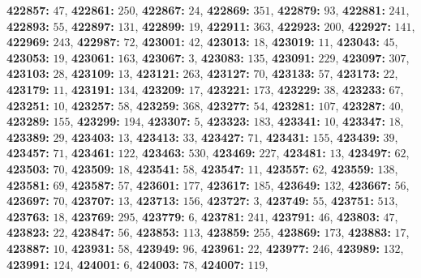 \textsf{\bfseries 422857:} $47$, \textsf{\bfseries 422861:} $250$, \textsf{\bfseries 422867:} $24$, \textsf{\bfseries 422869:} $351$, \textsf{\bfseries 422879:} $93$, \textsf{\bfseries 422881:} $241$, \textsf{\bfseries 422893:} $55$, \textsf{\bfseries 422897:} $131$, \textsf{\bfseries 422899:} $19$, \textsf{\bfseries 422911:} $363$, \textsf{\bfseries 422923:} $200$, \textsf{\bfseries 422927:} $141$, \textsf{\bfseries 422969:} $243$, \textsf{\bfseries 422987:} $72$, \textsf{\bfseries 423001:} $42$, \textsf{\bfseries 423013:} $18$, \textsf{\bfseries 423019:} $11$, \textsf{\bfseries 423043:} $45$, \textsf{\bfseries 423053:} $19$, \textsf{\bfseries 423061:} $163$, \textsf{\bfseries 423067:} $3$, \textsf{\bfseries 423083:} $135$, \textsf{\bfseries 423091:} $229$, \textsf{\bfseries 423097:} $307$, \textsf{\bfseries 423103:} $28$, \textsf{\bfseries 423109:} $13$, \textsf{\bfseries 423121:} $263$, \textsf{\bfseries 423127:} $70$, \textsf{\bfseries 423133:} $57$, \textsf{\bfseries 423173:} $22$, \textsf{\bfseries 423179:} $11$, \textsf{\bfseries 423191:} $134$, \textsf{\bfseries 423209:} $17$, \textsf{\bfseries 423221:} $173$, \textsf{\bfseries 423229:} $38$, \textsf{\bfseries 423233:} $67$, \textsf{\bfseries 423251:} $10$, \textsf{\bfseries 423257:} $58$, \textsf{\bfseries 423259:} $368$, \textsf{\bfseries 423277:} $54$, \textsf{\bfseries 423281:} $107$, \textsf{\bfseries 423287:} $40$, \textsf{\bfseries 423289:} $155$, \textsf{\bfseries 423299:} $194$, \textsf{\bfseries 423307:} $5$, \textsf{\bfseries 423323:} $183$, \textsf{\bfseries 423341:} $10$, \textsf{\bfseries 423347:} $18$, \textsf{\bfseries 423389:} $29$, \textsf{\bfseries 423403:} $13$, \textsf{\bfseries 423413:} $33$, \textsf{\bfseries 423427:} $71$, \textsf{\bfseries 423431:} $155$, \textsf{\bfseries 423439:} $39$, \textsf{\bfseries 423457:} $71$, \textsf{\bfseries 423461:} $122$, \textsf{\bfseries 423463:} $530$, \textsf{\bfseries 423469:} $227$, \textsf{\bfseries 423481:} $13$, \textsf{\bfseries 423497:} $62$, \textsf{\bfseries 423503:} $70$, \textsf{\bfseries 423509:} $18$, \textsf{\bfseries 423541:} $58$, \textsf{\bfseries 423547:} $11$, \textsf{\bfseries 423557:} $62$, \textsf{\bfseries 423559:} $138$, \textsf{\bfseries 423581:} $69$, \textsf{\bfseries 423587:} $57$, \textsf{\bfseries 423601:} $177$, \textsf{\bfseries 423617:} $185$, \textsf{\bfseries 423649:} $132$, \textsf{\bfseries 423667:} $56$, \textsf{\bfseries 423697:} $70$, \textsf{\bfseries 423707:} $13$, \textsf{\bfseries 423713:} $156$, \textsf{\bfseries 423727:} $3$, \textsf{\bfseries 423749:} $55$, \textsf{\bfseries 423751:} $513$, \textsf{\bfseries 423763:} $18$, \textsf{\bfseries 423769:} $295$, \textsf{\bfseries 423779:} $6$, \textsf{\bfseries 423781:} $241$, \textsf{\bfseries 423791:} $46$, \textsf{\bfseries 423803:} $47$, \textsf{\bfseries 423823:} $22$, \textsf{\bfseries 423847:} $56$, \textsf{\bfseries 423853:} $113$, \textsf{\bfseries 423859:} $255$, \textsf{\bfseries 423869:} $173$, \textsf{\bfseries 423883:} $17$, \textsf{\bfseries 423887:} $10$, \textsf{\bfseries 423931:} $58$, \textsf{\bfseries 423949:} $96$, \textsf{\bfseries 423961:} $22$, \textsf{\bfseries 423977:} $246$, \textsf{\bfseries 423989:} $132$, \textsf{\bfseries 423991:} $124$, \textsf{\bfseries 424001:} $6$, \textsf{\bfseries 424003:} $78$, \textsf{\bfseries 424007:} $119$, 
